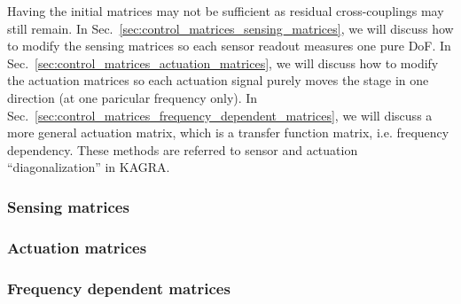 Having the initial matrices may not be sufficient as residual cross-couplings may still remain.
In Sec.~\ref{sec:control_matrices_sensing_matrices}, we will discuss how to modify the sensing matrices so each sensor readout measures one pure DoF.
In Sec.~\ref{sec:control_matrices_actuation_matrices}, we will discuss how to modify the actuation matrices so each actuation signal purely moves the stage in one direction (at one paricular frequency only).
In Sec.~\ref{sec:control_matrices_frequency_dependent_matrices}, we will discuss a more general actuation matrix, which is a transfer function matrix, i.e. frequency dependency.
These methods are referred to sensor and actuation ``diagonalization'' in KAGRA.

\subsubsection{Sensing matrices \label{sec:control_matrices_sensing_matrices}}
\subsubsection{Actuation matrices \label{sec:control_matrices_actuation_matrices}}
\subsubsection{Frequency dependent matrices \label{sec:control_matrices_frequency_dependent_matrices}}
